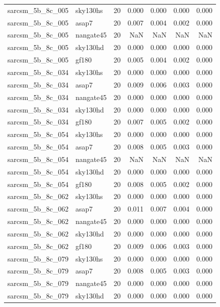 \begin{tabular}{llrrrrr}
sarcsm\_5b\_8c\_005 & sky130hs & 20 & 0.000 & 0.000 & 0.000 & 0.000 \\
sarcsm\_5b\_8c\_005 & asap7 & 20 & 0.007 & 0.004 & 0.002 & 0.000 \\
sarcsm\_5b\_8c\_005 & nangate45 & 20 & NaN & NaN & NaN & NaN \\
sarcsm\_5b\_8c\_005 & sky130hd & 20 & 0.000 & 0.000 & 0.000 & 0.000 \\
sarcsm\_5b\_8c\_005 & gf180 & 20 & 0.005 & 0.004 & 0.002 & 0.000 \\
sarcsm\_5b\_8c\_034 & sky130hs & 20 & 0.000 & 0.000 & 0.000 & 0.000 \\
sarcsm\_5b\_8c\_034 & asap7 & 20 & 0.009 & 0.006 & 0.003 & 0.000 \\
sarcsm\_5b\_8c\_034 & nangate45 & 20 & 0.000 & 0.000 & 0.000 & 0.000 \\
sarcsm\_5b\_8c\_034 & sky130hd & 20 & 0.000 & 0.000 & 0.000 & 0.000 \\
sarcsm\_5b\_8c\_034 & gf180 & 20 & 0.007 & 0.005 & 0.002 & 0.000 \\
sarcsm\_5b\_8c\_054 & sky130hs & 20 & 0.000 & 0.000 & 0.000 & 0.000 \\
sarcsm\_5b\_8c\_054 & asap7 & 20 & 0.008 & 0.005 & 0.003 & 0.000 \\
sarcsm\_5b\_8c\_054 & nangate45 & 20 & NaN & NaN & NaN & NaN \\
sarcsm\_5b\_8c\_054 & sky130hd & 20 & 0.000 & 0.000 & 0.000 & 0.000 \\
sarcsm\_5b\_8c\_054 & gf180 & 20 & 0.008 & 0.005 & 0.002 & 0.000 \\
sarcsm\_5b\_8c\_062 & sky130hs & 20 & 0.000 & 0.000 & 0.000 & 0.000 \\
sarcsm\_5b\_8c\_062 & asap7 & 20 & 0.011 & 0.007 & 0.004 & 0.000 \\
sarcsm\_5b\_8c\_062 & nangate45 & 20 & 0.000 & 0.000 & 0.000 & 0.000 \\
sarcsm\_5b\_8c\_062 & sky130hd & 20 & 0.000 & 0.000 & 0.000 & 0.000 \\
sarcsm\_5b\_8c\_062 & gf180 & 20 & 0.009 & 0.006 & 0.003 & 0.000 \\
sarcsm\_5b\_8c\_079 & sky130hs & 20 & 0.000 & 0.000 & 0.000 & 0.000 \\
sarcsm\_5b\_8c\_079 & asap7 & 20 & 0.008 & 0.005 & 0.003 & 0.000 \\
sarcsm\_5b\_8c\_079 & nangate45 & 20 & 0.000 & 0.000 & 0.000 & 0.000 \\
sarcsm\_5b\_8c\_079 & sky130hd & 20 & 0.000 & 0.000 & 0.000 & 0.000 \\

\end{tabular}
